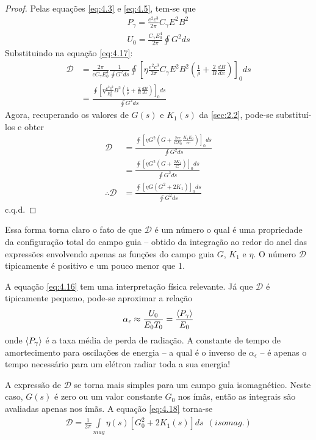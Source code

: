 \begin{proof}
	Pelas equações \eqref{eq:4.3} e \eqref{eq:4.5}, tem-se que
	\begin{align*}
		P_\gamma = \frac{e^2c^3}{2\pi}C_\gamma E^2B^2\\
		U_0 = \frac{C_\gamma E_0^4}{2\pi}\oint G^2 ds
	\end{align*}
	Substituindo na equação \eqref{eq:4.17}:
	\begin{align*}
		\mathscr{D} &= \frac{2\pi}{c C_\gamma E_0^4}\frac{1}{\oint G^2 ds}\oint \left[\eta \frac{e^2c^3}{2\pi}C_\gamma E^2B^2 \left(\frac{1}{\rho}+\frac{2}{B}\frac{dB}{dx}\right)\right]_0 ds\\
					&= \frac{\oint \left[\eta \frac{e^2c^2}{E_0^2} B^2 \left(\frac{1}{\rho}+\frac{2}{B}\frac{dB}{dx}\right)\right]_0 ds}{\oint G^2 ds}
	\end{align*}
	Agora, recuperando os valores de $G(s)$ e $K_1(s)$ da \autoref{sec:2.2}, pode-se substituí-los e obter
	\begin{align*}
		\mathscr{D} &= \frac{\oint \left[\eta G^2 \left(G +\frac{2ec}{G E_0}\frac{K_1 E_0}{ec}\right)\right]_0 ds}{\oint G^2 ds}\\
					&= \frac{\oint \left[\eta G^2 \left(G +\frac{2K_1}{G}\right)\right]_0 ds}{\oint G^2 ds}\\
		\therefore \mathscr{D} &= \frac{\oint \left[\eta G \left(G^2 +2K_1\right)\right]_0 ds}{\oint G^2 ds}
	\end{align*}
	c.q.d.
\end{proof}

Essa forma torna claro o fato de que $\mathscr{D}$ é um número o qual é uma propriedade da configuração total do campo guia -- obtido da integração ao redor do anel das expressões envolvendo apenas as funções do campo guia $G$, $K_1$ e $\eta$. O número $\mathscr{D}$ tipicamente é positivo e um pouco menor que 1.

A equação \eqref{eq:4.16} tem uma interpretação física relevante. Já que $\mathscr{D}$ é tipicamente pequeno, pode-se aproximar a relação
\begin{align}
	\alpha_\epsilon \approx \frac{U_0}{E_0T_0} = \frac{\left< P_\gamma \right>}{E_0}\label{eq:4.20}
\end{align}
onde $\left< P_\gamma \right>$ é a taxa média de perda de radiação. A constante de tempo de amortecimento para oscilações de energia -- a qual é o inverso de $\alpha_\epsilon$ -- é apenas o tempo necessário para um elétron radiar toda a sua energia!

A expressão de $\mathscr{D}$ se torna mais simples para um campo guia isomagnético. Neste caso, $G(s)$ é zero ou um valor constante $G_0$ nos ímãs, então as integrais são avaliadas apenas nos ímãs. A equação \eqref{eq:4.18} torna-se
\begin{align}
	\mathscr{D} = \frac{1}{2\pi} \int\limits_{mag}^{}\eta(s)\left[G_0^2 + 2K_1(s)\right]ds\ \ (isomag.)
\end{align}

